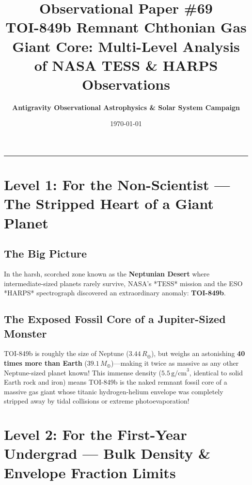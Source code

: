 \documentclass[11pt,a4paper]{article}
\title{\Huge \textbf{Observational Paper \#69}\\ \Large TOI-849b Remnant Chthonian Gas Giant Core: Multi-Level Analysis of NASA TESS \& HARPS Observations}
\author{\textbf{Antigravity Observational Astrophysics \& Solar System Campaign}}
\date{\today}
\begin{document}
\maketitle

\vspace{-1em}
\begin{center}
\rule{\textwidth}{1.5pt}
\end{center}

\section*{Level 1: For the Non-Scientist — The Stripped Heart of a Giant Planet}

\subsection*{The Big Picture}
In the harsh, scorched zone known as the \textbf{Neptunian Desert} where intermediate-sized planets rarely survive, NASA's *TESS* mission and the ESO *HARPS* spectrograph discovered an extraordinary anomaly: \textbf{TOI-849b}.

\subsection*{The Exposed Fossil Core of a Jupiter-Sized Monster}
TOI-849b is roughly the size of Neptune ($3.44\,R_\oplus$), but weighs an astonishing \textbf{40 times more than Earth} ($39.1\,M_\oplus$)—making it twice as massive as any other Neptune-sized planet known! This immense density ($5.5\,\text{g/cm}^3$, identical to solid Earth rock and iron) means TOI-849b is the naked remnant fossil core of a massive gas giant whose titanic hydrogen-helium envelope was completely stripped away by tidal collisions or extreme photoevaporation!

\newpage

\section*{Level 2: For the First-Year Undergrad — Bulk Density \& Envelope Fraction Limits}
\end{document}
